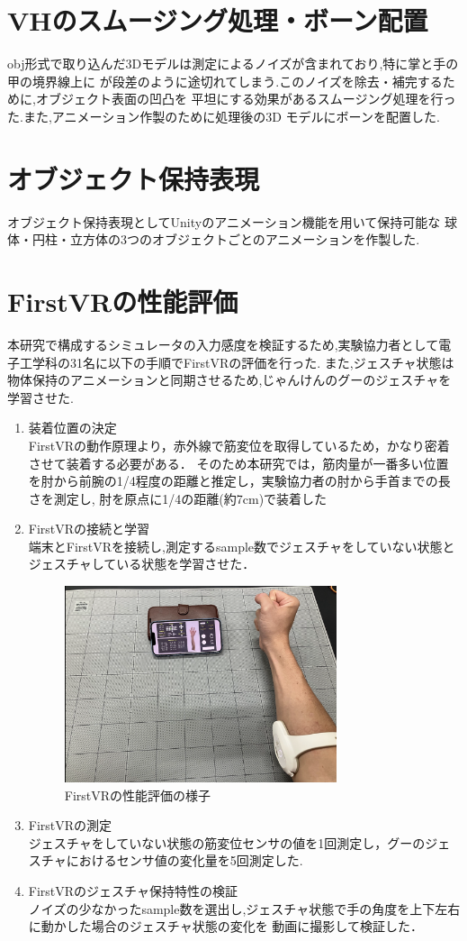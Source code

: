 \documentclass{ltjsreport}
\begin{document}
	\section{VHのスムージング処理・ボーン配置}
		obj形式で取り込んだ3Dモデルは測定によるノイズが含まれており,特に掌と手の甲の境界線上に
		が段差のように途切れてしまう.このノイズを除去・補完するために,オブジェクト表面の凹凸を
		平坦にする効果があるスムージング処理を行った.また,アニメーション作製のために処理後の3D
		モデルにボーンを配置した.

	
	\section{オブジェクト保持表現}
		オブジェクト保持表現としてUnityのアニメーション機能を用いて保持可能な
		球体・円柱・立方体の3つのオブジェクトごとのアニメーションを作製した.


	\section{FirstVRの性能評価}
		本研究で構成するシミュレータの入力感度を検証するため,実験協力者として電子工学科の31名に以下の手順でFirstVRの評価を行った.
		また,ジェスチャ状態は物体保持のアニメーションと同期させるため,じゃんけんのグーのジェスチャを学習させた.
		\begin{enumerate}
			\item 装着位置の決定\\
				FirstVRの動作原理より，赤外線で筋変位を取得しているため，かなり密着させて装着する必要がある．
				そのため本研究では，筋肉量が一番多い位置を肘から前腕の1/4程度の距離と推定し，実験協力者の肘から手首までの長さを測定し,
				肘を原点に1/4の距離(約7cm)で装着した
			\item FirstVRの接続と学習\\
				端末とFirstVRを接続し,測定するsample数でジェスチャをしていない状態とジェスチャしている状態を学習させた．
				\begin{figure}[H]
				\centering
				\includegraphics[width = 8cm]{../figs/IMG_5202.PNG}
				\caption{FirstVRの性能評価の様子}
				\label{fig:firstVRtest}
				\end{figure}
			\item FirstVRの測定\\
				ジェスチャをしていない状態の筋変位センサの値を1回測定し，グーのジェスチャにおけるセンサ値の変化量を5回測定した.
			\item FirstVRのジェスチャ保持特性の検証\\
				ノイズの少なかったsample数を選出し,ジェスチャ状態で手の角度を上下左右に動かした場合のジェスチャ状態の変化を
				動画に撮影して検証した．
		\end{enumerate}
\end{document}
